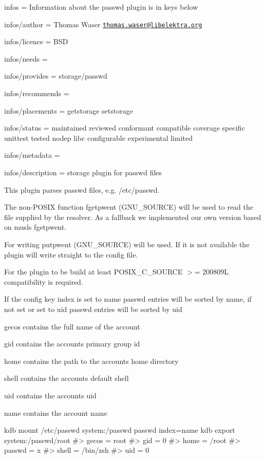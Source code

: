 
\begin{DoxyItemize}
\item infos = Information about the passwd plugin is in keys below
\item infos/author = Thomas Waser \href{mailto:thomas.waser@libelektra.org}{\tt thomas.\+waser@libelektra.\+org}
\item infos/licence = B\+SD
\item infos/needs =
\item infos/provides = storage/passwd
\item infos/recommends =
\item infos/placements = getstorage setstorage
\item infos/status = maintained reviewed conformant compatible coverage specific unittest tested nodep libc configurable experimental limited
\item infos/metadata =
\item infos/description = storage plugin for passwd files
\end{DoxyItemize}

This plugin parses {\ttfamily passwd} files, e.\+g. {\ttfamily /etc/passwd}.

The non-\/\+P\+O\+S\+IX function {\ttfamily fgetpwent} (G\+N\+U\+\_\+\+S\+O\+U\+R\+CE) will be used to read the file supplied by the resolver. As a fallback we implemented our own version based on musls {\ttfamily fgetpwent}.

For writing {\ttfamily putpwent} (G\+N\+U\+\_\+\+S\+O\+U\+R\+CE) will be used. If it is not available the plugin will write straight to the config file.

For the plugin to be build at least {\ttfamily P\+O\+S\+I\+X\+\_\+\+C\+\_\+\+S\+O\+U\+R\+CE $>$= 200809L} compatibility is required.

If the config key {\ttfamily index} is set to {\ttfamily name} passwd entries will be sorted by name, if not set or set to {\ttfamily uid} passwd entries will be sorted by uid


\begin{DoxyItemize}
\item {\ttfamily gecos} contains the full name of the account
\item {\ttfamily gid} contains the accounts primary group id
\item {\ttfamily home} contains the path to the accounts home directory
\item {\ttfamily shell} contains the accounts default shell
\item {\ttfamily uid} contains the accounts uid
\item {\ttfamily name} contains the account name
\end{DoxyItemize}


\begin{DoxyCode}
kdb mount /etc/passwd system:/passwd passwd index=name
kdb export system:/passwd/root
#> gecos = root
#> gid = 0
#> home = /root
#> passwd = x
#> shell = /bin/zsh
#> uid = 0
\end{DoxyCode}
 